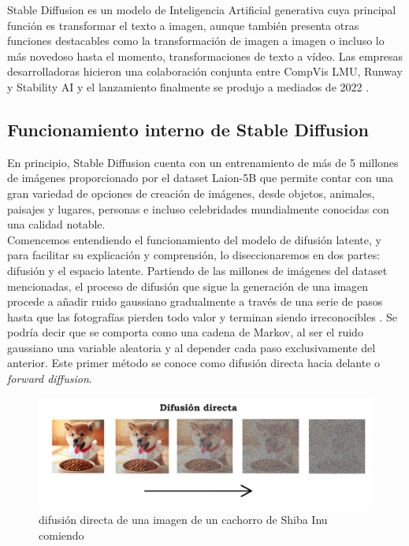 Stable Diffusion es un modelo de Inteligencia Artificial generativa cuya principal función es transformar el texto a imagen, aunque también presenta otras funciones destacables como la transformación de imagen a imagen o incluso lo más novedoso hasta el momento, transformaciones de texto a vídeo. Las empresas desarrolladoras hicieron una colaboración conjunta entre CompVis LMU, Runway y Stability AI y el lanzamiento finalmente se produjo a mediados de 2022  \citep{SDW2023}. \\


\subsection{Funcionamiento interno de Stable Diffusion}

En principio, Stable Diffusion cuenta con un entrenamiento de más de 5 millones de imágenes proporcionado por el dataset Laion-5B que permite contar con una gran variedad de opciones de creación de imágenes, desde objetos, animales, paisajes y lugares, personas e incluso celebridades mundialmente conocidas con una calidad notable.\\ 

Comencemos entendiendo el funcionamiento del modelo de difusión latente, y para facilitar su explicación y comprensión,  lo diseccionaremos en dos partes: difusión y el espacio latente. Partiendo de las millones de imágenes del dataset mencionadas, el proceso de difusión que sigue la generación de una imagen procede a añadir ruido gaussiano gradualmente a través de una serie de pasos hasta que las fotografías pierden todo valor y terminan siendo irreconocibles \citep{SDW2024}. Se podría decir que se comporta como una cadena de Markov, al ser el ruido gaussiano una variable aleatoria y al depender cada paso exclusivamente del anterior. Este primer método se conoce como difusión directa hacia delante o \textit{forward diffusion}.\\

\begin{figure}[h]
	\centering
	\includegraphics[width = 1 \textwidth]{Imagenes/Vectorial/difusiondirecta.png}
	\caption{difusión directa de una imagen de un cachorro de Shiba Inu comiendo}
	\label{fig:difusiondirecta}
\end{figure}

